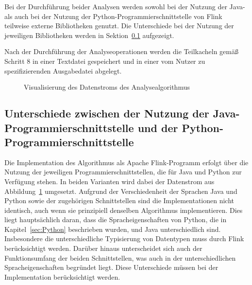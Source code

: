 Bei der Durchführung beider Analysen werden sowohl bei der Nutzung der Java- als auch bei der Nutzung der Python-Programmierschnittstelle von Flink teilweise externe Bibliotheken genutzt. Die Unterschiede bei der Nutzung der jeweiligen Bibliotheken werden in Sektion~\ref{sec:DifferencesJavaPyFlink} aufgezeigt. 

Nach der Durchführung der Analyseoperationen werden die Teilkacheln gemäß Schritt 8 in einer Textdatei gespeichert und in einer vom Nutzer zu spezifizierenden Ausgabedatei abgelegt.

\begin{figure}[h]
\centering

\caption{Visualisierung des Datenstroms des Analysealgorithmus} 
\label{fig:dataFlowAlgorithm}
\end{figure}


\subsection{Unterschiede zwischen der Nutzung der Java-Programmierschnittstelle und der Python-Programmierschnittstelle}
\label{sec:DifferencesJavaPyFlink}
Die Implementation des Algorithmus als Apache Flink-Programm erfolgt über die Nutzung der jeweiligen Programmierschnittstellen, die für Java und Python zur Verfügung stehen. In beiden Varianten wird dabei der Datenstrom aus Abbildung~\ref{fig:dataFlowAlgorithm} umgesetzt. Aufgrund der Verschiedenheit der Sprachen Java und Python sowie der zugehörigen Schnittstellen sind die Implementationen nicht identisch, auch wenn sie prinzipiell denselben Algorithmus implementieren. Dies liegt hauptsächlich daran, dass die Spracheigenschaften von Python, die in Kapitel~\ref{sec:Python} beschrieben wurden, und Java unterschiedlich sind. Insbesondere die unterschiedliche Typisierung von Datentypen muss durch Flink berücksichtigt werden. Darüber hinaus unterscheidet sich auch der Funktionsumfang der beiden Schnittstellen, was auch in der unterschiedlichen Spracheigenschaften begründet liegt. Diese Unterschiede müssen bei der Implementation berücksichtigt werden. 

